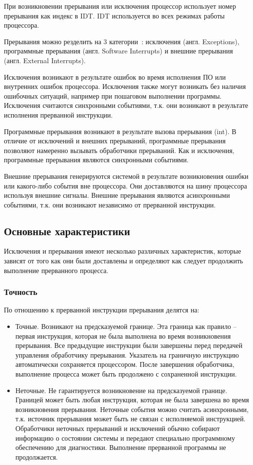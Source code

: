 При возникновении прерывания или исключения процессор использует номер
прерывания как индекс в IDT. IDT используется во всех режимах работы процессора.

Прерывания можно резделить на 3 категории~\cite{amd_pm_v2}: исключения (англ. Exceptions),
программные прерывания (англ. Software Interrupts) и внешние прерывания (англ. External Interrupts).

Исключения возникают в результате ошибок во время исполнения ПО или внутренних
ошибок процессора. Исключения также могут возникать без наличия ошибочных
ситуаций, например при пошаговом выполнении программы. Исключения считаются
синхронными событиями, т.к. они возникают в результате исполнения прерванной
инструкции.

Программные прерывания возникают в результате вызова прерывания (int). В
отличие от исключений и внешних прерываний, программные прерывания позволяют
намеренно вызывать обработчики прерываний. Как и исключения, программные
прерывания являются синхронными событиями.

Внешние прерывания генерируются системой в результате возникновения ошибки
или какого-либо события вне процессора. Они доставляются на шину процессора
используя внешние сигналы. Внешние прерывания являются асинхронными событиями,
т.к. они возникают независимо от прерванной инструкции.

\subsection{Основные характеристики}
Исключения и прерывания имеют несколько различных характеристик, которые
зависят от того как они были доставлены и определяют как следует продолжить выполнение
прерванного процесса.

\subsubsection*{Точность}
По отношению к прерванной инструкции прерывания делятся на:
\begin{itemize}
\item Точные. Возникают на предсказуемой границе. Эта граница
как правило -- первая инструкция, которая не была выполнена во время
возникновения прерывания. Все предыдущие инструкции были завершены перед
передачей управления обработчику прерывания. Указатель на граничную инструкцию
автоматически сохраняется процессором. После завершения обработчика, выполнение
процесса может быть продолжено с сохраненной инструкции.
\item Неточные. Не гарантируется возникновение на предсказуемой границе.
Границей может быть любая инструкция, которая не была завершена во время
возникновения прерывания. Неточные события можно считать асинхронными, т.к.
источник прерывания может быть не связан с исполняемой инструкцией.
Обработчики неточных прерываний и исключений обычно собирают информацию о
состоянии системы и передают специально программному обеспечению для
диагностики. Выполнение прерванной программы не продолжается.
\end{itemize}

